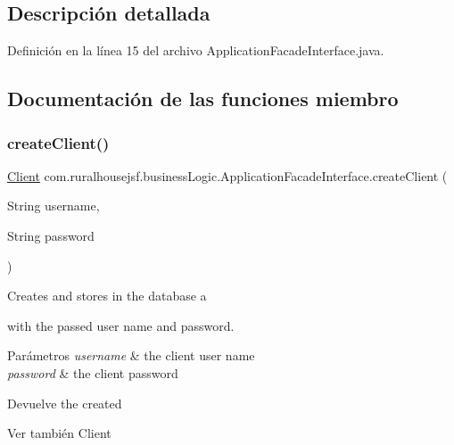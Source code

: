 \subsection{Descripción detallada}


Definición en la línea 15 del archivo Application\+Facade\+Interface.\+java.



\subsection{Documentación de las funciones miembro}
\mbox{\label{interfacecom_1_1ruralhousejsf_1_1business_logic_1_1_application_facade_interface_acb939a4c57b1136e2e8d1c7b661c10af}} 
\subsubsection{\texorpdfstring{createClient()}{createClient()}}
{\footnotesize\ttfamily \mbox{\hyperlink{classcom_1_1ruralhousejsf_1_1domain_1_1_client}{Client}} com.\+ruralhousejsf.\+business\+Logic.\+Application\+Facade\+Interface.\+create\+Client (\begin{DoxyParamCaption}\item[{String}]{username,  }\item[{String}]{password }\end{DoxyParamCaption})}

Creates and stores in the database a
\begin{DoxyCode}{0}
\end{DoxyCode}
 with the passed user name and password.


\begin{DoxyParams}{Parámetros}
{\em username} & the client user name \\
\hline
{\em password} & the client password\\
\hline
\end{DoxyParams}
\begin{DoxyReturn}{Devuelve}
the created
\begin{DoxyCode}{0}
\end{DoxyCode}

\end{DoxyReturn}
\begin{DoxySeeAlso}{Ver también}
Client 
\end{DoxySeeAlso}


